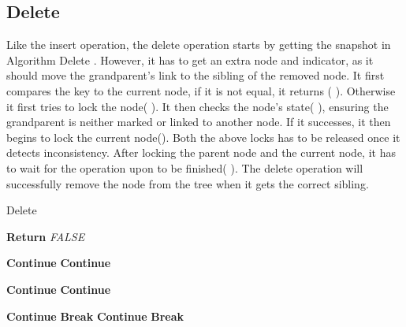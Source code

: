 \documentclass{article}
\begin{document}
\subsection{Delete}
Like the insert operation, the delete operation starts by getting the snapshot in Algorithm Delete  . However, it has to get an extra  node and  indicator, as it should move the grandparent's link to the sibling of the removed node. It first compares the key to the current node, if it is not equal, it returns ( ). Otherwise it first tries to lock the  node( ). It then checks the  node's state( ), ensuring the grandparent is neither marked or linked to another node. If it successes, it then begins to lock the current node(). Both the above locks has to be released once it detects inconsistency. After locking the parent node and the current node, it has to wait for the operation upon  to be finished( ). The delete operation will successfully remove the node from the tree when it gets the correct sibling. 
\begin{algorithm}
\caption{Delete}
\begin{algorithmic}[1]
    \While {}
        \State 
        \If {}
            \State \textbf{Return} \textit{FALSE}
        \EndIf
        
        \State {}
         
            \State \textbf{Continue}
        \Else
            \State 
                \State 
                \State 
                \State \textbf{Continue}
            \EndIf
               
            \If {} 
                \State 
                \State 
                \State \textbf{Continue}
            \Else
                \State 
                    \State 
                    \State 
                    \State 
                    \State 
                    \State \textbf{Continue}
                \EndIf
                
                \If {}
                    \State 
                \Else
                    \State 
                \EndIf
                
                \While {}
                    \If {}
                            \State 
                            \State \textbf{Continue}
                        \EndIf
                        \State \textbf{Break}
                    \Else
                            \State 
                            \State \textbf{Continue}
                        \EndIf
                        \State \textbf{Break}
                    \EndIf
                \EndWhile
            \EndIf
        \EndIf
\end{algorithmic}
\end{algorithm}
\end{document}
